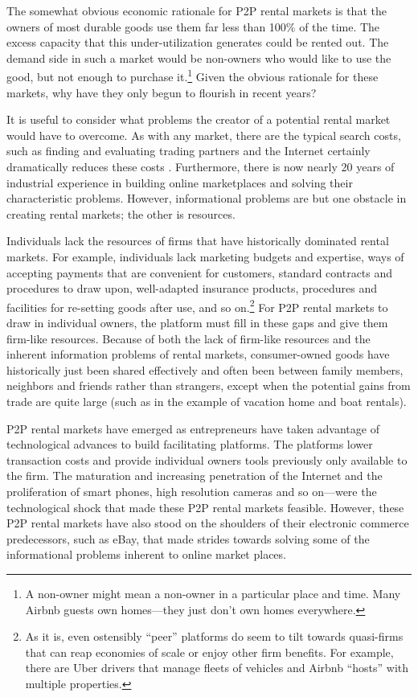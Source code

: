 \documentclass[11pt]{article}
\begin{document}
The somewhat obvious economic rationale for P2P rental markets is that the owners of most durable goods use them far less than 100\% of the time.
The excess capacity that this under-utilization generates could be rented out.
The demand side in such a market would be non-owners who would like to use the good, but not enough to purchase it.\footnote{
A non-owner might mean a non-owner in a particular place and time. 
Many Airbnb guests own homes---they just don't own homes everywhere. 
} 
Given the obvious rationale for these markets, why have they only begun to flourish in recent years? 

It is useful to consider what problems the creator of a potential rental market would have to overcome.
As with any market, there are the typical search costs, such as finding and evaluating trading partners and the Internet certainly dramatically reduces these costs \citep{bakos1997reducing}.
Furthermore, there is now nearly 20 years of industrial experience in building online marketplaces and solving their characteristic problems. 
However, informational problems are but one obstacle in creating rental markets; the other is resources. 

Individuals lack the resources of firms that have historically dominated rental markets. 
For example, individuals lack marketing budgets and expertise, ways of accepting payments that are convenient for customers, standard contracts and procedures to draw upon, well-adapted insurance products, procedures and facilities for re-setting goods after use, and so on.\footnote{
  As it is, even ostensibly ``peer'' platforms do seem to tilt towards quasi-firms that can reap economies of scale or enjoy other firm benefits.
  For example, there are Uber drivers that manage fleets of vehicles and Airbnb ``hosts'' with multiple properties. 
  }
For P2P rental markets to draw in individual owners, the platform must fill in these gaps and give them firm-like resources. 
Because of both the lack of firm-like resources and the inherent information problems of rental markets, consumer-owned goods have historically just been shared effectively and often been between family members, neighbors and friends rather than strangers, except when the potential gains from trade are quite large (such as in the example of vacation home and boat rentals). 

P2P rental markets have emerged as entrepreneurs have taken advantage of technological advances to build facilitating platforms. 
The platforms lower transaction costs and provide individual owners tools previously only available to the firm. 
The maturation and increasing penetration of the Internet and the proliferation of smart phones, high resolution cameras and so on---were the technological shock that made these P2P rental markets feasible. 
However, these P2P rental markets have also stood on the shoulders of their electronic commerce predecessors, such as eBay, that made strides towards solving some of the informational problems inherent to online market places. 
\end{document}
